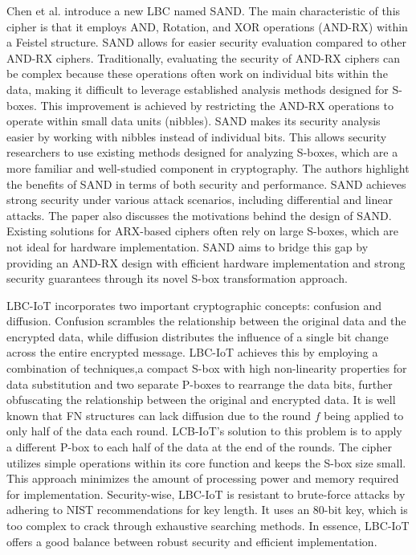\documentclass[conference]{IEEEtran}
\begin{document}
Chen et al. introduce a new LBC named SAND. The main characteristic of this cipher is that it employs AND, Rotation, and XOR operations (AND-RX) within a Feistel structure. SAND allows for easier security evaluation compared to other AND-RX ciphers. Traditionally, evaluating the security of AND-RX ciphers can be complex because these operations often work on individual bits within the data, making it difficult to leverage established analysis methods designed for S-boxes. This improvement is achieved by restricting the AND-RX operations to operate within small data units (nibbles). SAND makes its security analysis easier by working with nibbles instead of individual bits. This allows security researchers to use existing methods designed for analyzing S-boxes, which are a more familiar and well-studied component in cryptography. The authors highlight the benefits of SAND in terms of both security and performance. SAND achieves strong security under various attack scenarios, including differential and linear attacks. The paper also discusses the motivations behind the design of SAND. Existing solutions for ARX-based ciphers often rely on large S-boxes, which are not ideal for hardware implementation. SAND aims to bridge this gap by providing an AND-RX design with efficient hardware implementation and strong security guarantees through its novel S-box transformation approach.\cite{SAND}


LBC-IoT incorporates two important cryptographic concepts: confusion and diffusion. Confusion scrambles the relationship between the original data and the encrypted data, while diffusion distributes the influence of a single bit change across the entire encrypted message. LBC-IoT achieves this by employing a combination of techniques,a compact S-box with high non-linearity properties for data substitution and two separate P-boxes to rearrange the data bits, further obfuscating the relationship between the original and encrypted data. It is well known that FN structures can lack diffusion due to the round $f$ being applied to only half of the data each round. LCB-IoT's solution to this problem is to apply a different P-box to each half of the data at the end of the rounds. The cipher utilizes simple operations within its core function and keeps the S-box size small. This approach minimizes the amount of processing power and memory required for implementation. Security-wise, LBC-IoT is resistant to brute-force attacks by adhering to NIST recommendations for key length. It uses an 80-bit key, which is too complex to crack through exhaustive searching methods. In essence, LBC-IoT offers a good balance between robust security and efficient implementation.\cite{LBC-IoT}
\end{document}
